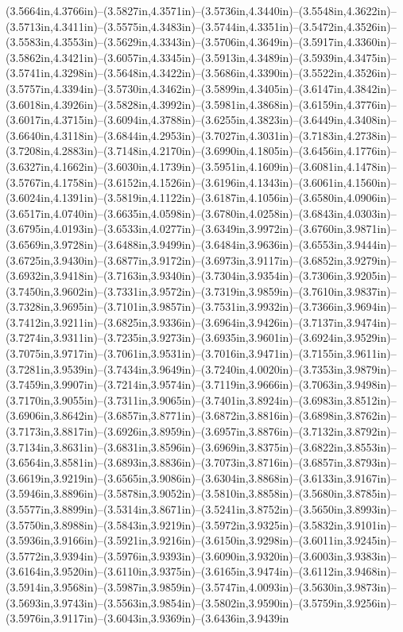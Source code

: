 (3.5664in,4.3766in)--(3.5827in,4.3571in)--(3.5736in,4.3440in)--(3.5548in,4.3622in)--(3.5713in,4.3411in)--(3.5575in,4.3483in)--(3.5744in,4.3351in)--(3.5472in,4.3526in)--(3.5583in,4.3553in)--(3.5629in,4.3343in)--(3.5706in,4.3649in)--(3.5917in,4.3360in)--(3.5862in,4.3421in)--(3.6057in,4.3345in)--(3.5913in,4.3489in)--(3.5939in,4.3475in)--(3.5741in,4.3298in)--(3.5648in,4.3422in)--(3.5686in,4.3390in)--(3.5522in,4.3526in)--(3.5757in,4.3394in)--(3.5730in,4.3462in)--(3.5899in,4.3405in)--(3.6147in,4.3842in)--(3.6018in,4.3926in)--(3.5828in,4.3992in)--(3.5981in,4.3868in)--(3.6159in,4.3776in)--(3.6017in,4.3715in)--(3.6094in,4.3788in)--(3.6255in,4.3823in)--(3.6449in,4.3408in)--(3.6640in,4.3118in)--(3.6844in,4.2953in)--(3.7027in,4.3031in)--(3.7183in,4.2738in)--(3.7208in,4.2883in)--(3.7148in,4.2170in)--(3.6990in,4.1805in)--(3.6456in,4.1776in)--(3.6327in,4.1662in)--(3.6030in,4.1739in)--(3.5951in,4.1609in)--(3.6081in,4.1478in)--(3.5767in,4.1758in)--(3.6152in,4.1526in)--(3.6196in,4.1343in)--(3.6061in,4.1560in)--(3.6024in,4.1391in)--(3.5819in,4.1122in)--(3.6187in,4.1056in)--(3.6580in,4.0906in)--(3.6517in,4.0740in)--(3.6635in,4.0598in)--(3.6780in,4.0258in)--(3.6843in,4.0303in)--(3.6795in,4.0193in)--(3.6533in,4.0277in)--(3.6349in,3.9972in)--(3.6760in,3.9871in)--(3.6569in,3.9728in)--(3.6488in,3.9499in)--(3.6484in,3.9636in)--(3.6553in,3.9444in)--(3.6725in,3.9430in)--(3.6877in,3.9172in)--(3.6973in,3.9117in)--(3.6852in,3.9279in)--(3.6932in,3.9418in)--(3.7163in,3.9340in)--(3.7304in,3.9354in)--(3.7306in,3.9205in)--(3.7450in,3.9602in)--(3.7331in,3.9572in)--(3.7319in,3.9859in)--(3.7610in,3.9837in)--(3.7328in,3.9695in)--(3.7101in,3.9857in)--(3.7531in,3.9932in)--(3.7366in,3.9694in)--(3.7412in,3.9211in)--(3.6825in,3.9336in)--(3.6964in,3.9426in)--(3.7137in,3.9474in)--(3.7274in,3.9311in)--(3.7235in,3.9273in)--(3.6935in,3.9601in)--(3.6924in,3.9529in)--(3.7075in,3.9717in)--(3.7061in,3.9531in)--(3.7016in,3.9471in)--(3.7155in,3.9611in)--(3.7281in,3.9539in)--(3.7434in,3.9649in)--(3.7240in,4.0020in)--(3.7353in,3.9879in)--(3.7459in,3.9907in)--(3.7214in,3.9574in)--(3.7119in,3.9666in)--(3.7063in,3.9498in)--(3.7170in,3.9055in)--(3.7311in,3.9065in)--(3.7401in,3.8924in)--(3.6983in,3.8512in)--(3.6906in,3.8642in)--(3.6857in,3.8771in)--(3.6872in,3.8816in)--(3.6898in,3.8762in)--(3.7173in,3.8817in)--(3.6926in,3.8959in)--(3.6957in,3.8876in)--(3.7132in,3.8792in)--(3.7134in,3.8631in)--(3.6831in,3.8596in)--(3.6969in,3.8375in)--(3.6822in,3.8553in)--(3.6564in,3.8581in)--(3.6893in,3.8836in)--(3.7073in,3.8716in)--(3.6857in,3.8793in)--(3.6619in,3.9219in)--(3.6565in,3.9086in)--(3.6304in,3.8868in)--(3.6133in,3.9167in)--(3.5946in,3.8896in)--(3.5878in,3.9052in)--(3.5810in,3.8858in)--(3.5680in,3.8785in)--(3.5577in,3.8899in)--(3.5314in,3.8671in)--(3.5241in,3.8752in)--(3.5650in,3.8993in)--(3.5750in,3.8988in)--(3.5843in,3.9219in)--(3.5972in,3.9325in)--(3.5832in,3.9101in)--(3.5936in,3.9166in)--(3.5921in,3.9216in)--(3.6150in,3.9298in)--(3.6011in,3.9245in)--(3.5772in,3.9394in)--(3.5976in,3.9393in)--(3.6090in,3.9320in)--(3.6003in,3.9383in)--(3.6164in,3.9520in)--(3.6110in,3.9375in)--(3.6165in,3.9474in)--(3.6112in,3.9468in)--(3.5914in,3.9568in)--(3.5987in,3.9859in)--(3.5747in,4.0093in)--(3.5630in,3.9873in)--(3.5693in,3.9743in)--(3.5563in,3.9854in)--(3.5802in,3.9590in)--(3.5759in,3.9256in)--(3.5976in,3.9117in)--(3.6043in,3.9369in)--(3.6436in,3.9439in